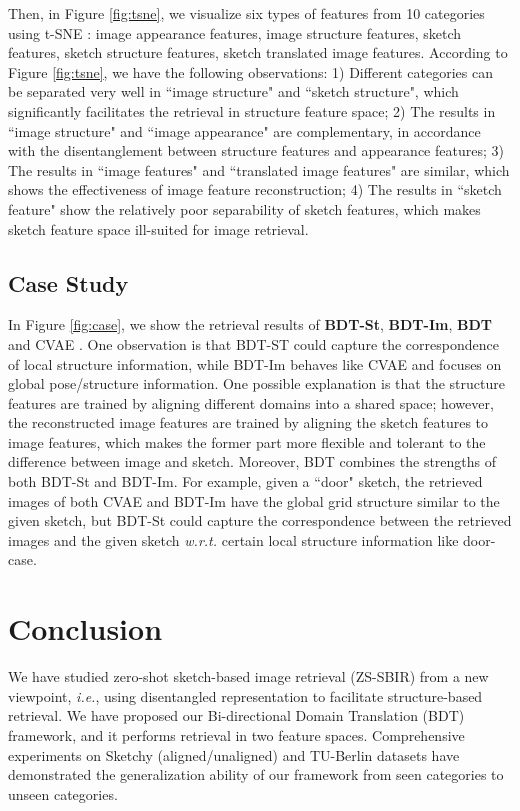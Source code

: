 \documentclass[10pt,twocolumn,letterpaper]{article}
\begin{document}
Then, in Figure \ref{fig:tsne}, we visualize six types of features from 10 categories using t-SNE \cite{maaten2008visualizing}: image appearance features, image structure features, sketch features, sketch structure features, sketch translated image features. According to Figure \ref{fig:tsne}, we have the following observations: 1) Different categories can be separated very well in ``image structure" and ``sketch structure", which significantly facilitates the retrieval in structure feature space; 2) The results in ``image structure" and ``image appearance" are complementary, in accordance with the disentanglement between structure features and appearance features; 3) The results in ``image features" and ``translated image features" are similar, which shows the effectiveness of image feature reconstruction; 4) The results in ``sketch feature" show the relatively poor separability of sketch features, which makes sketch feature space ill-suited for image retrieval.

\subsection{Case Study}
In Figure \ref{fig:case}, we show the retrieval results of \textbf{BDT-St}, \textbf{BDT-Im}, \textbf{BDT} and CVAE \cite{yelamarthi2018zero}. One observation is that BDT-ST could capture the correspondence of local structure information, while BDT-Im behaves like CVAE and focuses on global pose/structure information. One possible explanation is that the structure features are trained by aligning different domains into a shared space; however, the reconstructed image features are trained by aligning the sketch features to image features, which makes the former part more flexible and tolerant to the difference between image and sketch. Moreover, BDT combines the strengths of both BDT-St and BDT-Im. For example, given a ``door" sketch, the retrieved images of both CVAE and BDT-Im have the global grid structure similar to the given sketch, but BDT-St could capture the correspondence between the retrieved images and the given sketch \emph{w.r.t.} certain local structure information like door-case.

\section{Conclusion}
We have studied zero-shot sketch-based image retrieval (ZS-SBIR) from a new viewpoint, \emph{i.e.}, using disentangled representation to facilitate structure-based retrieval. We have proposed our Bi-directional Domain Translation (BDT) framework, and it performs retrieval in two feature spaces. Comprehensive experiments on Sketchy (aligned/unaligned) and TU-Berlin datasets have demonstrated the generalization ability of our framework from seen categories to unseen categories.

{\small


}
\end{document}
